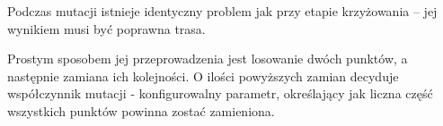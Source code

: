 
Podczas mutacji istnieje identyczny problem jak przy etapie krzyżowania -- jej wynikiem musi być poprawna trasa. 

Prostym sposobem jej przeprowadzenia jest losowanie dwóch punktów, a następnie zamiana ich kolejności. O ilości powyższych zamian decyduje współczynnik mutacji - konfigurowalny parametr, określający jak liczna część wszystkich punktów powinna zostać zamieniona.